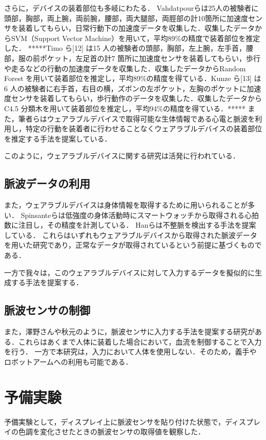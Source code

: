 \documentclass[submit,techrep]{ipsj}
\begin{document}
さらに，デバイスの装着部位も多岐にわたる．
Vahdatpourら\cite{localization_vahdatpour}は25人の被験者に頭部，胸部，両上腕，両前腕，腰部，両大腿部，両脛部の計10箇所に加速度センサを装着してもらい，日常行動下の加速度データを収集した．収集したデータからSVM（Support Vector Machine）を用いて，平均89\%の精度で装着部位を推定した．
*****Timo ら[12] は15 人の被験者の頭部，胸部，左上腕，左手首，腰部，服の前ポケット，左足首の計7 箇所に加速度センサを装着してもらい，歩行や走るなどの行動の加速度データを収集した．収集したデータからRandom Forest を用いて装着部位を推定し，平均89\%の精度を得ている．Kunze ら[13] は6 人の被験者に右手首，右目の横，ズボンの左ポケット，左胸のポケットに加速度センサを装着してもらい，歩行動作のデータを収集した．収集したデータからC4.5 分類木を用いて装着部位を推定し，平均94\%の精度を得ている．*****
また，筆者ら\cite{localization_yoshida}はウェアラブルデバイスで取得可能な生体情報である心電と脈波を利用し，特定の行動を装着者に行わせることなくウェアラブルデバイスの装着部位を推定する手法を提案している．
\par

このように，ウェアラブルデバイスに関する研究は活発に行われている．


\subsection{脈波データの利用}
また，ウェアラブルデバイスは身体情報を取得するために用いられることが多い．
Spinsanteら\cite{accuracy_in_low_intensity}は低強度の身体活動時にスマートウォッチから取得される心拍数に注目し，その精度を計測している．
Hanら\cite{arrhythmia_detection}は不整脈を検出する手法を提案している．
これらはいずれもウェアラブルデバイスから取得された脈波データを用いた研究であり，正常なデータが取得されているという前提に基づくものである．
\par

一方で我々は，このウェアラブルデバイスに対して入力するデータを擬似的に生成する手法を提案する．

\subsection{脈波センサの制御}
また，澤野さんや秋元のように，脈波センサに入力する手法を提案する研究がある．これらはあくまで人体に装着した場合において，血流を制御することで入力を行う．
一方で本研究は，入力において人体を使用しない．そのため，義手やロボットアームへの利用も可能である．


\section{予備実験}
予備実験として，ディスプレイ上に脈波センサを貼り付けた状態で，ディスプレイの色調を変化させたときの脈波センサの取得値を観察した．
\end{document}
